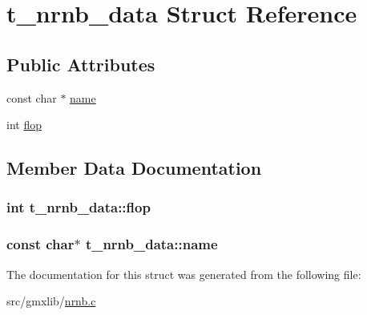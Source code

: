 \hypertarget{structt__nrnb__data}{\section{t\-\_\-nrnb\-\_\-data \-Struct \-Reference}
\label{structt__nrnb__data}
}
\subsection*{\-Public \-Attributes}
\begin{DoxyCompactItemize}
\item 
const char $\ast$ \hyperlink{structt__nrnb__data_ae440ec00b6506e04848127911ebdce27}{name}
\item 
int \hyperlink{structt__nrnb__data_aa6d98202522e220423a8ac1f3322f6ec}{flop}
\end{DoxyCompactItemize}


\subsection{\-Member \-Data \-Documentation}
\hypertarget{structt__nrnb__data_aa6d98202522e220423a8ac1f3322f6ec}{
\subsubsection[{flop}]{\setlength{\rightskip}{0pt plus 5cm}int {\bf t\-\_\-nrnb\-\_\-data\-::flop}}}\label{structt__nrnb__data_aa6d98202522e220423a8ac1f3322f6ec}
\hypertarget{structt__nrnb__data_ae440ec00b6506e04848127911ebdce27}{
\subsubsection[{name}]{\setlength{\rightskip}{0pt plus 5cm}const char$\ast$ {\bf t\-\_\-nrnb\-\_\-data\-::name}}}\label{structt__nrnb__data_ae440ec00b6506e04848127911ebdce27}


\-The documentation for this struct was generated from the following file\-:\begin{DoxyCompactItemize}
\item 
src/gmxlib/\hyperlink{nrnb_8c}{nrnb.\-c}\end{DoxyCompactItemize}
